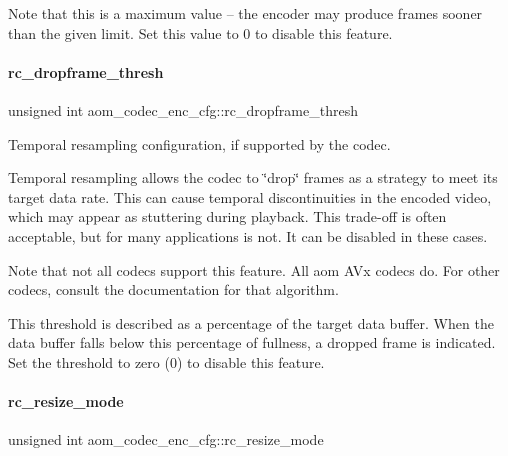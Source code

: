 Note that this is a maximum value -- the encoder may produce frames sooner than the given limit. Set this value to 0 to disable this feature. \mbox{\label{structaom__codec__enc__cfg_a0b64b07e9238ee51f6195b1bbb7cd2fd}} 
\paragraph{\texorpdfstring{rc\+\_\+dropframe\+\_\+thresh}{rc\_dropframe\_thresh}}
{\footnotesize\ttfamily unsigned int aom\+\_\+codec\+\_\+enc\+\_\+cfg\+::rc\+\_\+dropframe\+\_\+thresh}



Temporal resampling configuration, if supported by the codec. 

Temporal resampling allows the codec to \char`\"{}drop\char`\"{} frames as a strategy to meet its target data rate. This can cause temporal discontinuities in the encoded video, which may appear as stuttering during playback. This trade-\/off is often acceptable, but for many applications is not. It can be disabled in these cases.

Note that not all codecs support this feature. All aom A\+Vx codecs do. For other codecs, consult the documentation for that algorithm.

This threshold is described as a percentage of the target data buffer. When the data buffer falls below this percentage of fullness, a dropped frame is indicated. Set the threshold to zero (0) to disable this feature. \mbox{\label{structaom__codec__enc__cfg_ab9123d944cd168511d65c823b30d5705}} 
\paragraph{\texorpdfstring{rc\+\_\+resize\+\_\+mode}{rc\_resize\_mode}}
{\footnotesize\ttfamily unsigned int aom\+\_\+codec\+\_\+enc\+\_\+cfg\+::rc\+\_\+resize\+\_\+mode}



